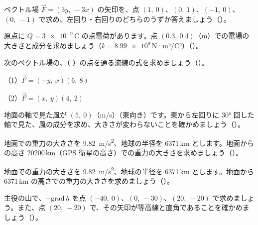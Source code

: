 \bkproblem ベクトル場 $\vec F=(3y,\ -3x)$ の矢印を、点 $(1,\ 0)$、$(0,\ 1)$、$(-1,\ 0)$、$(0,\ -1)$ で求め、左回り・右回りのどちらのうずか答えましょう\mbox{（）}。

\bkproblem 原点に $Q=\num{3e-9}$\,C の点電荷があります。点 $(0.3,\ 0.4)$（m）での電場の大きさと成分を求めましょう（$k=\num{8.99e9}$\,N·m²/C²）\mbox{（）}。

\bkproblem 次のベクトル場の、（ ）の点を通る流線の式を求めましょう\mbox{（）}。\par
（1）$\vec F=(-y,\ x)$\quad $(6,\ 8)$\par
（2）$\vec F=(x,\ y)$\quad $(4,\ 2)$

\bkproblem 地面の軸で見た風が $(5,\ 0)$（m/s）（東向き）です。東から左回りに $30°$ 回した軸で見た、風の成分を求め、大きさが変わらないことを確かめましょう\mbox{（）}。

\bkproblem 地面での重力の大きさを \qty{9.82}{m/s^2}、地球の半径を \num{6371}\,km とします。地面からの高さ \num{20200}\,km（GPS 衛星の高さ）での重力の大きさを求めましょう\mbox{（）}。


\bkproblem 地面での重力の大きさを \qty{9.82}{m/s^2}、地球の半径を \num{6371}\,km とします。地面から \num{6371}\,km の高さでの重力の大きさを求めましょう\mbox{（）}。

\bkproblem 主役の山で、$-\mathrm{grad}\,h$ を点 $(-40,\ 0)$、$(0,\ -30)$、$(20,\ -20)$ で求めましょう。また、点 $(20,\ -20)$ で、その矢印が等高線と直角であることを確かめましょう\mbox{（）}。

